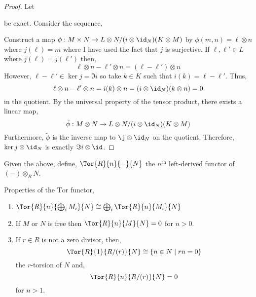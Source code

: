 \documentclass[12pt]{extarticle}
\begin{document}
\begin{proof}
Let
\begin{center}
\end{center}
be exact. Consider the sequence,
\begin{center}
\end{center}
Construct a map $\phi : M \times N \to L \otimes N / (i \otimes \id_N)(K \otimes M)$ by $\phi(m,n) = \ell \otimes n$ where $j(\ell) = m$ where I have used the fact that $j$ is surjective. If $\ell, \ell' \in L$ where $j(\ell) = j(\ell')$ then,
\[ \ell \otimes n - \ell' \otimes n = (\ell - \ell') \otimes n \]
However, $\ell - \ell' \in \ker{j} = \Im{i}$ so take $k \in K$ such that $i(k) = \ell - \ell'$. Thus,
\[  \ell \otimes n - \ell' \otimes n = i(k) \otimes n = (i \otimes \id_N)(k \otimes n) = 0 \]
in the quotient. By the universal property of the tensor product, there exists a linear map,
\[ \tilde{\phi} : M \otimes N \to  L \otimes N / (i \otimes \id_N)(K \otimes M) \]
Furthermore, $\tilde{\phi}$ is the inverse map to $\j \otimes \id_N$ on the quotient. Therefore, $\ker{j \otimes \id_N}$ is exactly $\Im{i \otimes \id}$. 
\end{proof}

\begin{definition}
Given the above, define, $\Tor{R}{n}{-}{N}$ the $n^\mathrm{th}$ left-derived functor of $(-) \otimes_R N$.
\end{definition}

\begin{proposition}
Properties of the $\mathrm{Tor}$ functor,
\begin{enumerate}
\item $\Tor{R}{n}{\bigoplus_{i} M_i}{N} \cong \bigoplus_{i} \Tor{R}{n}{M_i}{N}$

\item If $M$ or $N$ is free then $\Tor{R}{n}{M}{N} = 0$ for $n > 0$.

\item If $r \in R$ is not a zero divisor, then,
\[ \Tor{R}{1}{R/(r)}{N} \cong \{n \in N \mid rn = 0 \} \]
the $r$-torsion of $N$ and,
\[ \Tor{R}{n}{R/(r)}{N} = 0 \]
for $n > 1$.
\end{enumerate}
\end{proposition}
\end{document}
